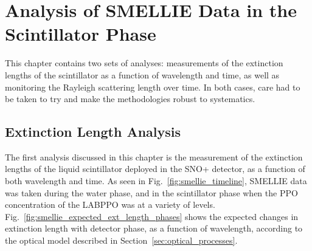 \chapter{Analysis of SMELLIE Data in the Scintillator Phase}\label{chap:smellie_analysis}

This chapter contains two sets of analyses: measurements of the extinction lengths of the scintillator as a function of wavelength and time, as well as monitoring the Rayleigh scattering length over time. In both cases, care had to be taken to try and make the methodologies robust to systematics.

\section{Extinction Length Analysis}\label{sec:ext_length_analysis}
The first analysis discussed in this chapter is the measurement of the extinction lengths of the liquid scintillator deployed in the SNO+ detector, as a function of both wavelength and time. As seen in Fig.~\ref{fig:smellie_timeline}, SMELLIE data was taken during the water phase, and in the scintillator phase when the PPO concentration of the LABPPO was at a variety of levels. Fig.~\ref{fig:smellie_expected_ext_length_phases} shows the expected changes in extinction length with detector phase, as a function of wavelength, according to the optical model described in Section~\ref{sec:optical_processes}.

